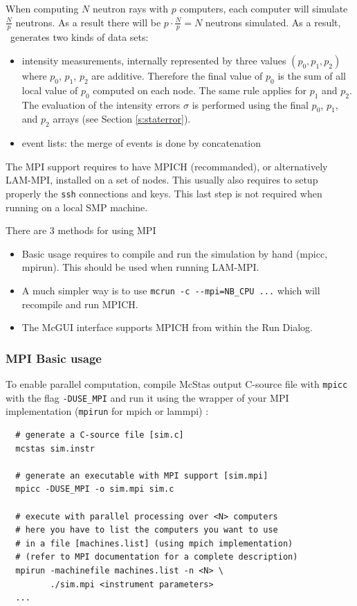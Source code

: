 When computing $N$ neutron rays with
$p$ computers, each computer will simulate $\frac{N}{p}$
neutrons. As a result there will be $p \cdot \frac{N}{p} = N$
neutrons simulated. As a result, \MCS\ generates two kinds of data sets:
\begin{itemize}
\item intensity measurements, internally represented by three
  values $(p_0, p_1, p_2)$ where $p_0$, $p_1$, $p_2$ are
  additive. Therefore the final value of $p_0$ is the sum of all
  local value of  $p_0$ computed on each node. The same rule applies
  for $p_1$ and $p_2$. The evaluation of the intensity errors $\sigma$
  is performed using the final $p_0$, $p_1$, and $p_2$ arrays (see Section \ref{s:staterror}).
\item event lists: the merge of events is done by concatenation
\end{itemize}
The MPI support requires to have MPICH (recommanded), or alternatively LAM-MPI, installed on a set of nodes.
This usually also requires to setup properly the \texttt{ssh} connections and keys. This last step is not required when running on a local SMP machine.

There are 3 methods for using MPI
\begin{itemize}
\item Basic usage requires to compile and run the simulation by hand (mpicc, mpirun). This should be used when running LAM-MPI.
\item A much simpler way is to use \verb+mcrun -c --mpi=NB_CPU ...+ which will recompile and run MPICH.
\item The McGUI interface supports MPICH from within the Run Dialog.
\end{itemize}

\subsubsection{MPI Basic usage}

To enable parallel computation, compile McStas output C-source file
with \verb'mpicc' with the flag \verb'-DUSE_MPI' and run it using the
wrapper of your MPI implementation (\verb'mpirun' for mpich or lammpi) :
\begin{verbatim}
  # generate a C-source file [sim.c]
  mcstas sim.instr

  # generate an executable with MPI support [sim.mpi]
  mpicc -DUSE_MPI -o sim.mpi sim.c

  # execute with parallel processing over <N> computers
  # here you have to list the computers you want to use
  # in a file [machines.list] (using mpich implementation)
  # (refer to MPI documentation for a complete description)
  mpirun -machinefile machines.list -n <N> \
         ./sim.mpi <instrument parameters>
  ...
\end{verbatim}

